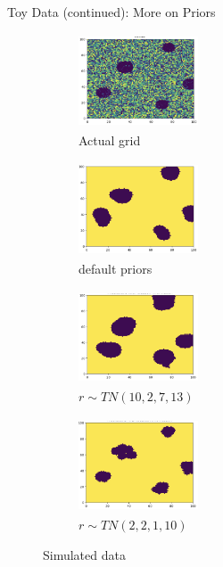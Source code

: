 \documentclass[10pt,mathserif]{beamer}
\begin{document}
\begin{frame}{Toy Data (continued): More on Priors}
\begin{figure}[t!]
    \centering
    \begin{subfigure}[t]{0.3\textwidth}
        \centering
        \includegraphics[height=1.1in, width=1.4in]{../BDC_gridactual}
        \caption{Actual grid}
    \end{subfigure}%
    \begin{subfigure}[t]{0.3\textwidth}
        \centering
        \includegraphics[height=1.1in, width=1.4in]{../BDC_grid1}
        \caption{default priors}
    \end{subfigure} %
    \begin{subfigure}[t]{0.3\textwidth}
        \centering
        \includegraphics[height=1.1in, width=1.4in]{../BDC_grid4}
        \caption{ $r \sim TN(10, 2, 7, 13)$}
    \end{subfigure}%
        \begin{subfigure}[t]{0.3\textwidth}
        \centering
        \includegraphics[height=1.1in, width=1.4in]{../BDC_grid5}
        \caption{ $r \sim TN(2, 2, 1, 10)$}
    \end{subfigure}
    \caption{Simulated data}
\end{figure}
\end{frame}
\end{document}
